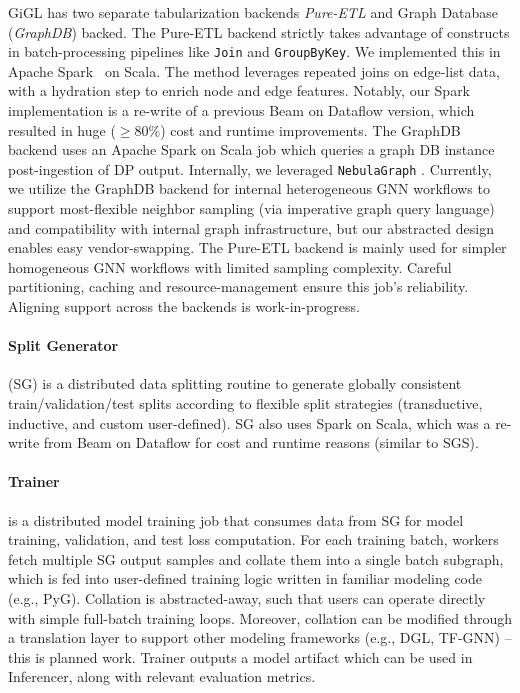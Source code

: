 GiGL has two separate tabularization backends \emph{Pure-ETL} and Graph Database (\emph{GraphDB}) backed. The Pure-ETL backend strictly takes advantage of constructs in batch-processing pipelines like {\small\texttt{Join}} and {\small\texttt{GroupByKey}}. We implemented this in Apache Spark~\cite{salloum2016big} on Scala. The method leverages repeated joins on edge-list data, with a hydration step to enrich node and edge features.  Notably, our Spark implementation is a re-write of a previous Beam on Dataflow version, which resulted in huge (${\geq}80\%$) cost and runtime improvements.  The GraphDB backend uses an Apache Spark on Scala job which queries a graph DB instance post-ingestion of DP output. Internally, we leveraged {\small\texttt{NebulaGraph}} \cite{wu2022nebula}.  Currently, we utilize the GraphDB backend for internal heterogeneous GNN workflows to support most-flexible neighbor sampling (via imperative graph query language) and compatibility with internal graph infrastructure, but our abstracted design enables easy vendor-swapping.  The Pure-ETL backend is mainly used for simpler homogeneous GNN workflows with limited sampling complexity.  Careful partitioning, caching and resource-management ensure this job's reliability. Aligning support across the backends is work-in-progress.

\paragraph{Split Generator} (SG)
is a distributed data splitting routine to generate globally consistent train/validation/test splits according to flexible split strategies (transductive, inductive, and custom user-defined).  SG also uses Spark on Scala, which was a re-write from Beam on Dataflow for cost and runtime reasons (similar to SGS). 

\paragraph{Trainer}
is a distributed model training job that consumes data from SG for model training, validation, and test loss computation. %
For each training batch, workers fetch multiple SG output samples and collate them into a single batch subgraph, which is 
fed into user-defined training logic written in familiar modeling code (e.g., PyG). Collation is abstracted-away, such that users can operate directly with simple full-batch training loops.  Moreover, collation can be modified through a translation layer to support other modeling frameworks (e.g., DGL, TF-GNN) -- this is planned work. Trainer outputs a model artifact which can be used in Inferencer, along with relevant evaluation metrics. 

